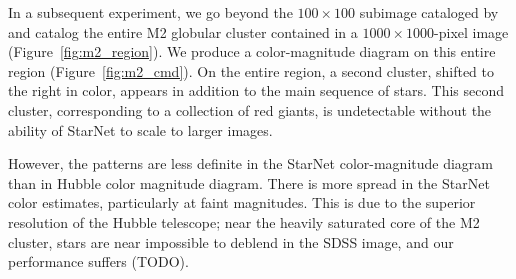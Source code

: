

In a subsequent experiment, 
we go beyond the $100\times100$ subimage
cataloged by \cite{Feder_2019} and 
catalog the entire M2 globular cluster 
contained in a $1000 \times 1000$-pixel image (Figure~\ref{fig:m2_region}). 
We produce a color-magnitude diagram on this entire region (Figure~\ref{fig:m2_cmd}). 
On the entire region, a second cluster, 
shifted to the right in color, 
appears in addition to the main sequence of stars.
This second cluster, corresponding to a collection of red giants, 
is undetectable without the ability of StarNet to 
scale to larger images. 

However, 
the patterns are less definite in the StarNet color-magnitude diagram than in Hubble color magnitude diagram.
There is more spread in the StarNet color estimates, particularly at faint magnitudes. 
This is due to the superior resolution of the Hubble telescope; near the heavily saturated core of the M2 cluster, stars are near impossible to deblend in the SDSS image, and our performance suffers (TODO). 





